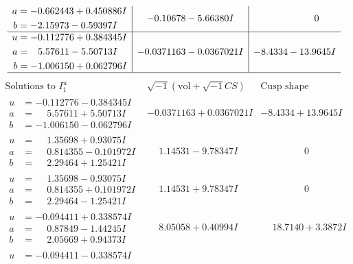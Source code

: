 \documentclass[1p]{elsarticle_modified}
\theoremstyle{definition}
\newcommand{\I}{\sqrt{-1}}
\begin{document}
$$\begin{array}{c|c|c}
\begin{aligned}
a &= -0.662443 + 0.450886 I \\
b &= -2.15973 - 0.59397 I\end{aligned}
 & -0.10678 - 5.66380 I & \phantom{-0.000000 } 0 \\ \hline\begin{aligned}
u &= -0.112776 + 0.384345 I \\
a &= \phantom{-}5.57611 - 5.50713 I \\
b &= -1.006150 + 0.062796 I\end{aligned}
 & -0.0371163 - 0.0367021 I & -8.4334 - 13.9645 I\\
 \hline 
 \end{array}$$\newpage$$\begin{array}{c|c|c}  
\text{Solutions to }I^u_{1}& \I (\text{vol} + \sqrt{-1}CS) & \text{Cusp shape}\\
 \hline 
\begin{aligned}
u &= -0.112776 - 0.384345 I \\
a &= \phantom{-}5.57611 + 5.50713 I \\
b &= -1.006150 - 0.062796 I\end{aligned}
 & -0.0371163 + 0.0367021 I & -8.4334 + 13.9645 I \\ \hline\begin{aligned}
u &= \phantom{-}1.35698 + 0.93075 I \\
a &= \phantom{-}0.814355 - 0.101972 I \\
b &= \phantom{-}2.29464 + 1.25421 I\end{aligned}
 & \phantom{-}1.14531 - 9.78347 I & \phantom{-0.000000 } 0 \\ \hline\begin{aligned}
u &= \phantom{-}1.35698 - 0.93075 I \\
a &= \phantom{-}0.814355 + 0.101972 I \\
b &= \phantom{-}2.29464 - 1.25421 I\end{aligned}
 & \phantom{-}1.14531 + 9.78347 I & \phantom{-0.000000 } 0 \\ \hline\begin{aligned}
u &= -0.094411 + 0.338574 I \\
a &= \phantom{-}0.87849 - 1.44245 I \\
b &= \phantom{-}2.05669 + 0.94373 I\end{aligned}
 & \phantom{-}8.05058 + 0.40994 I & \phantom{-}18.7140 + 3.3872 I \\ \hline\begin{aligned}
u &= -0.094411 - 0.338574 I \\

\end{aligned}
\end{array}$$
\end{document}
